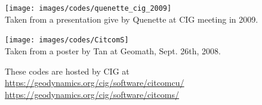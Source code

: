 \begin{center}
\texttt{[image: images/codes/quenette\_cig\_2009]}\\
{\captionfont Taken from a presentation give by Quenette at CIG meeting in 2009.}
\end{center}

\begin{center}
\texttt{[image: images/codes/CitcomS]}\\
{\captionfont Taken from a poster by Tan \etal at Geomath, Sept. 26th, 2008.}
\end{center}

These codes are hosted by CIG at\\
\url{https://geodynamics.org/cig/software/citcomcu/}  \\
\url{https://geodynamics.org/cig/software/citcoms/}

